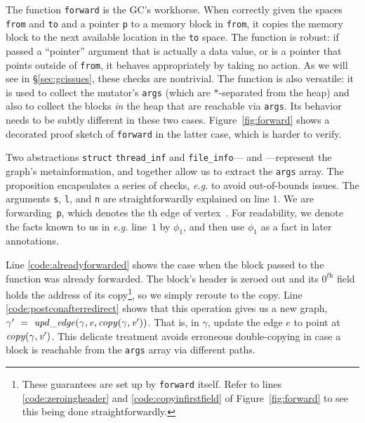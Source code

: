 \documentclass[acmsmall,screen]{acmart}
\newcommand{\li}[1]{{\texttt{\small #1}}}
\newcommand{\tx}[1]{\text{#1}}
\begin{document}
\renewcommand{\tx}[1]{\text{#1}}
 The function \li{forward} is the GC's workhorse.
When correctly given the spaces \li{from} and \li{to} and a pointer
\li{p} to a memory block in \li{from},
it copies the memory block to the next
available location in the \li{to} space.
The function is robust: if passed a ``pointer'' argument
that is actually a data value, or is a pointer that points outside of
\li{from}, it behaves appropriately by taking no action.
As we will see in \S\ref{sec:gcissues}, these checks are nontrivial.
The function is also versatile: it is used to collect the
mutator's \li{args} (which are $*$-separated from the heap)
and also to collect the blocks \emph{in} the heap that are reachable via
\li{args}. Its behavior needs to be subtly different in these
two cases.
Figure~\ref{fig:forward} shows a decorated proof sketch of \li{forward}
in the latter case, which is harder to verify.

Two abstractions \li{struct} \li{thread\_inf}
and \li{file\_info}--- and ---represent the 
graph's metainformation, and together allow us to
extract the \li{args} array. The
proposition  encapsulates a series of checks, 
\emph{e.g.} to avoid out-of-bounds issues.
The arguments \li{s}, \li{l}, and \li{n} are straightforwardly
explained on line $1$. 
We are forwarding~\li{p}, 
which denotes the th edge of vertex~. 
For readability,
we denote the facts known to us in
\emph{e.g.} line~$1$ by $\phi_1$, and then use $\phi_1$
as a fact in later annotations.

Line \ref{code:alreadyforwarded} shows
the case when the block passed to the function was already forwarded.
The block's header is zeroed out and its $0^\textit{th}$ field holds
the address of its
copy\footnote{These guarantees are set up by \texttt{\scriptsize forward} itself.
Refer to lines \ref{code:zeroingheader} and
\ref{code:copyinfirstfield} of Figure~\ref{fig:forward} to see this being done straightforwardly.},
so we simply reroute to the copy. 
Line \ref{code:postconafterredirect} shows that this operation
gives us a new graph, 
$\gamma'~=~\mathit{upd\_edge}(\gamma, \mathit{e}, \mathit{copy}(\gamma, \mathit{v'}))$.
That is, in $\gamma$, update the edge $e$ to point at
$\mathit{copy}(\gamma, \mathit{v'})$. 
This delicate treatment avoids erroneous double-copying
in case a block is reachable from the \li{args} array via different paths.
\end{document}
